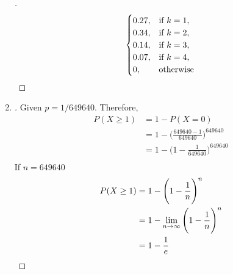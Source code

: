 \documentclass[paper=usletter, fontsize=12pt]{article}
\begin{document}
\begin{enumerate}
\begin{proof}[\unskip\nopunct]
\begin{equation*}
\begin{cases}
                    0.27, & \text{if}\ k = 1,\\
                    0.34, & \text{if}\ k = 2,\\
                    0.14, & \text{if}\ k = 3,\\
                    0.07, & \text{if}\ k = 4,\\
                    0, & \text{otherwise}
                \end{cases} \qedhere
            \end{equation*}
        \end{proof}
        \vspace{0.2in}

        \item
        \begin{proof}[\unskip\nopunct]
            Given $p = 1/649640$.
            Therefore,
            \begingroup
            \addtolength{\jot}{1em}
            \begin{align*}
                P(X \ge 1) & = 1 - P(X = 0)\\
                & = 1 - \Bigg(\frac{649640-1}{649640}\Bigg)^{649640}\\
                & = 1 - \Bigg(1 - \frac{1}{649640}\Bigg)^{649640}\\
            \end{align*}
            If $n = 649640$
            \begin{align*}
                P(X \ge 1) & = 1 - \Bigg(1 - \frac{1}{n}\Bigg)^{n}\\
                & = 1 - \lim_{n \rightarrow \infty}\Bigg(1 -
                \frac{1}{n}\Bigg)^{n}\\
                & = 1 - \frac{1}{e} \qedhere
            \end{align*}
            \endgroup
        \end{proof}
        \vspace{0.2in}


\end{enumerate}
\end{document}
